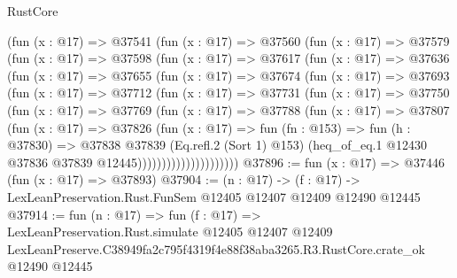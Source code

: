\begin{lexlean}{RustCore}
\begin{coremodule}
          (fun (x : @17) =>
          @37541
            (fun (x : @17) =>
            @37560
              (fun (x : @17) =>
              @37579
                (fun (x : @17) =>
                @37598
                  (fun (x : @17) =>
                  @37617
                    (fun (x : @17) =>
                    @37636
                      (fun (x : @17) =>
                      @37655
                        (fun (x : @17) =>
                        @37674
                          (fun (x : @17) =>
                          @37693
                            (fun (x : @17) =>
                            @37712
                              (fun (x : @17) =>
                              @37731
                                (fun (x : @17) =>
                                @37750
                                  (fun (x : @17) =>
                                  @37769
                                    (fun (x : @17) =>
                                    @37788
                                      (fun (x : @17) =>
                                      @37807
                                        (fun (x : @17) =>
                                        @37826
                                          (fun (x : @17) =>
                                          fun (fn : @153) =>
                                          fun (h : @37830) =>
                                          @37838
                                            @37839
                                            (Eq.refl.{2} (Sort 1) @153)
                                            (heq_of_eq.{1}
                                              @12430
                                              @37836
                                              @37839
                                              @12445)))))))))))))))))))))
@37896 := fun (x : @17) => @37446 (fun (x : @17) => @37893)
@37904 := (n : @17) ->
  (f : @17) -> LexLeanPreservation.Rust.FunSem @12405 @12407 @12409 @12490 @12445
@37914 := fun (n : @17) =>
  fun (f : @17) =>
  LexLeanPreservation.Rust.simulate
    @12405
    @12407
    @12409
    LexLeanPreserve.C38949fa2c795f4319f4e88f38aba3265.R3.RustCore.crate_ok
    @12490
    @12445
\end{coremodule}
\end{lexlean}
